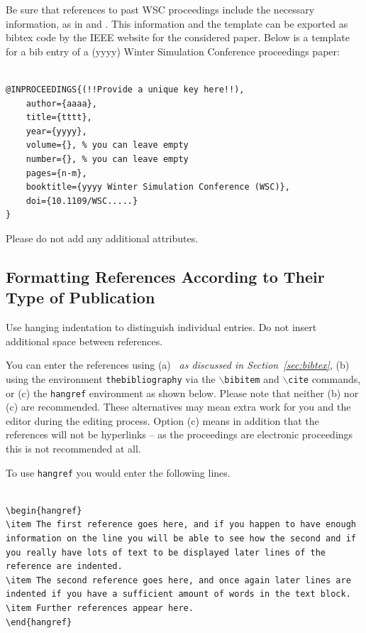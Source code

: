 \documentclass{wscpaperproc}
\theoremstyle{wsc}
\begin{document}
Be sure that references to past WSC proceedings include the necessary information, as in  and . This information and the template can be exported as bibtex code by the IEEE website for the considered paper. Below is a template for a bib entry of a (yyyy) Winter Simulation Conference proceedings paper:

\begin{verbatim}

@INPROCEEDINGS{(!!Provide a unique key here!!),
	author={aaaa},
	title={tttt},
	year={yyyy},
	volume={}, % you can leave empty
	number={}, % you can leave empty
	pages={n-m},
	booktitle={yyyy Winter Simulation Conference (WSC)},
	doi={10.1109/WSC.....}
}

\end{verbatim}

Please do not add any additional attributes.


\subsection{Formatting References According to Their Type of Publication}

Use hanging indentation to distinguish individual entries. Do not insert additional space between references.

You can enter the references using (a) {\em \BibTeX\ as discussed in Section~\ref{sec:bibtex}}, (b) using the environment {\tt thebibliography} via the {\tt $\backslash$bibitem} and {\tt $\backslash$cite} commands, or (c) the {\tt hangref} environment as shown below.
Please note that neither (b) nor (c) are recommended. These alternatives may mean extra work for you and the editor during the editing process. Option (c) means in addition that the references will not be hyperlinks -- as the proceedings are electronic proceedings this is not recommended at all.

To use {\tt hangref} you would enter the following lines.

\begin{verbatim}

\begin{hangref}
\item The first reference goes here, and if you happen to have enough
information on the line you will be able to see how the second and if
you really have lots of text to be displayed later lines of the
reference are indented.
\item The second reference goes here, and once again later lines are
indented if you have a sufficient amount of words in the text block.
\item Further references appear here.
\end{hangref}

\end{verbatim}
\end{document}

